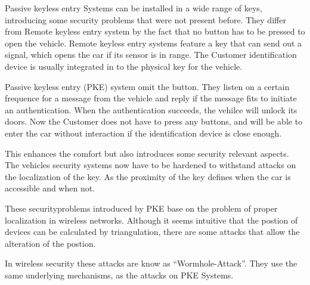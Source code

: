 Passive keyless entry Systems can be installed in a wide range of keys,
introducing some security problems that were not present before.
They differ from Remote keyless entry system by the fact that no
button has to be pressed to open the vehicle.
Remote keyless entry systems feature a key that can send out a signal,
which opens the car if its sensor is in range.
The Customer identification device is usually integrated in to the physical key
for the vehicle.

Passive keyless entry (PKE) system omit the button.
They listen on a certain frequence for a message from the vehicle
and reply if the message fits to initiate an authentication.
When the authentication succeeds, the vehilce will unlock its doors.
Now the Customer does not have to press any buttons,
and will be able to enter the car without interaction 
if the identification device is close enough.

This enhances the comfort but also introduces some security relevant aspects.
The vehicles security systems now have to be hardened
to withstand attacks on the localization of the key.
As the proximity of the key defines when the car is accessible and when not. 

These securityproblems introduced by PKE base on the problem of proper
localization in wireless networks.
Although it seems intuitive that the postion of devices can be calculated by
triangulation, there are some attacks that allow the alteration of the postion.


In wireless security these attacks are know as ``Wormhole-Attack''.
They use the same underlying mechanisms, as the attacks on PKE Systems.


